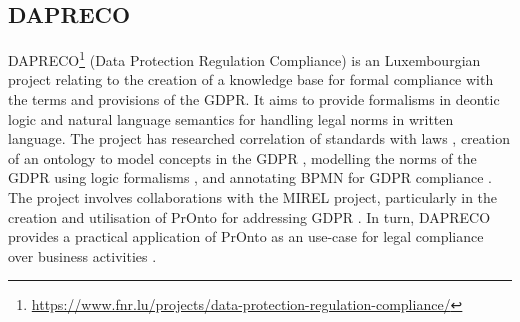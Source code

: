 \subsection*{DAPRECO}\label{sec:sota:DAPRECO}
DAPRECO\footnote{\url{https://www.fnr.lu/projects/data-protection-regulation-compliance/}} (Data Protection Regulation Compliance) is an Luxembourgian project relating to the creation of a knowledge base for formal compliance with the terms and provisions of the GDPR. It aims to provide formalisms in deontic logic and natural language semantics for handling legal norms in written language. The project has researched correlation of standards with laws \cite{bartolini_towards_2016}, creation of an ontology to model concepts in the GDPR \cite{otake_using_2017}, modelling the norms of the GDPR using logic formalisms \cite{bartolini_legal_2018}, and annotating BPMN for GDPR compliance \cite{bartolini_enhancing_2019}.
The project involves collaborations with the MIREL project, particularly in the creation and utilisation of PrOnto for addressing GDPR \cite{monica_legal_2018,palmirani_pronto_2018,palmirani_pronto_2018-1,bartolini_enhancing_2019}. In turn, DAPRECO provides a practical application of PrOnto as an use-case for legal compliance over business activities \cite{bartolini_enhancing_2019,bartolini_agile_2019}.


